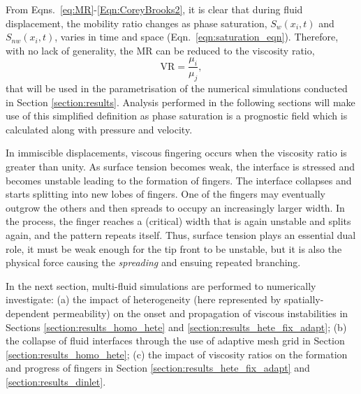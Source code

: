 \documentclass[preprint,authoryear,12pt]{elsarticle}
\newcommand{\frc}{\displaystyle\frac}
\begin{document}
\medskip
From Eqns.~\ref{eq:MR}-\ref{Eqn:CoreyBrooks2}, it is clear that during fluid displacement, the mobility ratio changes as phase saturation, $S_{w}\left(x_{i},t\right)$ and $S_{nw}\left(x_{i},t\right)$, varies in time and space (Eqn.~\ref{eqn:saturation_eqn}). Therefore, with no lack of generality, the MR can be reduced to the viscosity ratio,
\begin{displaymath}
    \text{VR} = \frc{\mu_{i}}{\mu_{j}},
\end{displaymath}
 that will be used in the parametrisation of the numerical simulations conducted in Section \ref{section:results}. Analysis performed in the following sections will make use of this simplified definition as phase saturation is a prognostic field which is calculated along with pressure and velocity.

\medskip
In immiscible displacements, viscous fingering occurs when the viscosity ratio is greater than unity. As surface tension becomes weak, the interface is stressed and becomes unstable leading to the formation of fingers. The interface collapses and starts splitting into new lobes of fingers. One of the fingers may eventually outgrow the others and then spreads to occupy an increasingly larger width. In the process, the finger reaches a (critical) width that is again unstable and splits again, and the pattern repeats itself. Thus, surface tension plays an essential dual role, it must be weak enough for the tip front to be unstable, but it is also the physical force causing the \textit{spreading} and ensuing repeated branching.

\medskip
In the next section, multi-fluid simulations are performed to numerically investigate: (a) the impact of heterogeneity (here represented by spatially-dependent permeability) on the onset and propagation of viscous instabilities in Sections \ref{section:results_homo_hete} and \ref{section:results_hete_fix_adapt}; (b) the collapse of fluid interfaces through the use of adaptive mesh grid in Section \ref{section:results_homo_hete}; (c) the impact of viscosity ratios on the formation and progress of fingers in Section \ref{section:results_hete_fix_adapt} and \ref{section:results_dinlet}.


\end{document}
